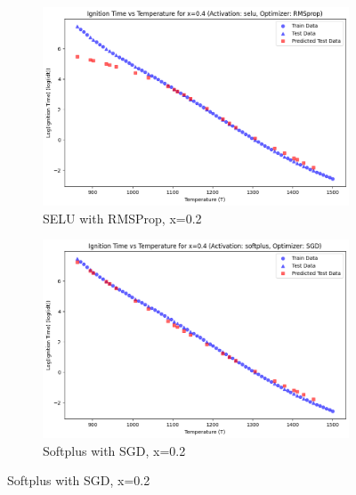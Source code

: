 \documentclass[12pt]{report}
\begin{document}
\begin{figure}[H]
    \centering
    \begin{subfigure}[t]{0.48\textwidth}
        \centering
        \includegraphics[width=\textwidth, keepaspectratio]{selu_rms_04.png}
        \caption{SELU with RMSProp, x=0.2}
    \end{subfigure}
    \hfill
    \begin{subfigure}[t]{0.48\textwidth}
        \centering
        \includegraphics[width=\textwidth, keepaspectratio]{softplus_sgd_04.png}
        \caption{Softplus with SGD, x=0.2}
    \end{subfigure}
\end{figure}
\end{document}
